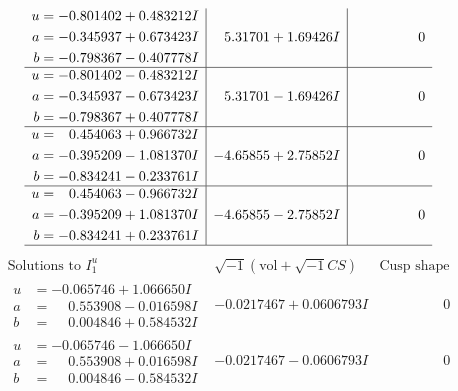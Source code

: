 \documentclass[1p]{elsarticle_modified}
\theoremstyle{definition}
\newcommand{\I}{\sqrt{-1}}
\begin{document}
$$\begin{array}{c|c|c}
\begin{aligned}
u &= -0.801402 + 0.483212 I \\
a &= -0.345937 + 0.673423 I \\
b &= -0.798367 - 0.407778 I\end{aligned}
 & \phantom{-}5.31701 + 1.69426 I & \phantom{-0.000000 } 0 \\ \hline\begin{aligned}
u &= -0.801402 - 0.483212 I \\
a &= -0.345937 - 0.673423 I \\
b &= -0.798367 + 0.407778 I\end{aligned}
 & \phantom{-}5.31701 - 1.69426 I & \phantom{-0.000000 } 0 \\ \hline\begin{aligned}
u &= \phantom{-}0.454063 + 0.966732 I \\
a &= -0.395209 - 1.081370 I \\
b &= -0.834241 - 0.233761 I\end{aligned}
 & -4.65855 + 2.75852 I & \phantom{-0.000000 } 0 \\ \hline\begin{aligned}
u &= \phantom{-}0.454063 - 0.966732 I \\
a &= -0.395209 + 1.081370 I \\
b &= -0.834241 + 0.233761 I\end{aligned}
 & -4.65855 - 2.75852 I & \phantom{-0.000000 } 0\\
 \hline 
 \end{array}$$\newpage$$\begin{array}{c|c|c}  
\text{Solutions to }I^u_{1}& \I (\text{vol} + \sqrt{-1}CS) & \text{Cusp shape}\\
 \hline 
\begin{aligned}
u &= -0.065746 + 1.066650 I \\
a &= \phantom{-}0.553908 - 0.016598 I \\
b &= \phantom{-}0.004846 + 0.584532 I\end{aligned}
 & -0.0217467 + 0.0606793 I & \phantom{-0.000000 } 0 \\ \hline\begin{aligned}
u &= -0.065746 - 1.066650 I \\
a &= \phantom{-}0.553908 + 0.016598 I \\
b &= \phantom{-}0.004846 - 0.584532 I\end{aligned}
 & -0.0217467 - 0.0606793 I & \phantom{-0.000000 } 0 \\ \hline\begin{aligned}

\end{aligned}
\end{array}$$
\end{document}
